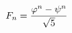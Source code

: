 \documentclass[preview]{standalone}
\begin{document}
\begin{align*}
\special{dvisvgm:raw <g id='unique000'>}F_n = \frac{\varphi^n - \psi^n}{\sqrt{5}}\special{dvisvgm:raw </g>}
\end{align*}
\end{document}
